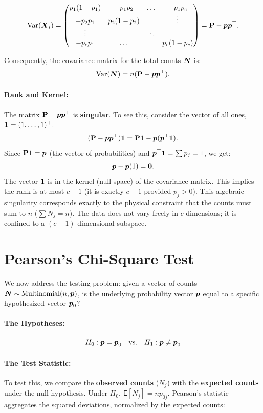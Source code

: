 \[
    \text{Var}(\boldsymbol{X}_i) = \begin{pmatrix}
        p_1(1-p_1) & -p_1p_2 & \dots & -p_1p_c \\
        -p_2p_1 & p_2(1-p_2) & & \vdots \\
        \vdots & & \ddots & \\
        -p_cp_1 & \dots & & p_c(1-p_c)
    \end{pmatrix}
    = \mathbf{P} - \boldsymbol{p}\boldsymbol{p}^\top.
\]

Consequently, the covariance matrix for the total counts $\boldsymbol{N}$ is:
\[
    \text{Var}(\boldsymbol{N}) = n (\mathbf{P} - \boldsymbol{p}\boldsymbol{p}^\top).
\]

\paragraph{Rank and Kernel:}
The matrix $\mathbf{P} - \boldsymbol{p}\boldsymbol{p}^\top$ is \textbf{singular}. To see this, consider the vector of all ones, $\boldsymbol{1} = (1, \dots, 1)^\top$.
\[
    (\mathbf{P} - \boldsymbol{p}\boldsymbol{p}^\top)\boldsymbol{1} = \mathbf{P}\boldsymbol{1} - \boldsymbol{p}(\boldsymbol{p}^\top \boldsymbol{1}).
\]
Since $\mathbf{P}\boldsymbol{1} = \boldsymbol{p}$ (the vector of probabilities) and $\boldsymbol{p}^\top \boldsymbol{1} = \sum p_j = 1$, we get:
\[
    \boldsymbol{p} - \boldsymbol{p}(1) = \boldsymbol{0}.
\]
The vector $\boldsymbol{1}$ is in the kernel (null space) of the covariance matrix. This implies the rank is at most $c-1$ (it is exactly $c-1$ provided $p_j > 0$).
This algebraic singularity corresponds exactly to the physical constraint that the counts must sum to $n$ ($\sum N_j = n$). The data does not vary freely in $c$ dimensions; it is confined to a $(c-1)$-dimensional subspace.

\section{Pearson's Chi-Square Test}
\label{sec:Pearson's Chi-Square Test}

We now address the testing problem: given a vector of counts $\boldsymbol{N} \sim \text{Multinomial}(n, \boldsymbol{p})$, is the underlying probability vector $\boldsymbol{p}$ equal to a specific hypothesized vector $\boldsymbol{p}_0$?

\paragraph{The Hypotheses:}
\[
    H_0: \boldsymbol{p} = \boldsymbol{p}_0 \quad \text{vs.} \quad H_1: \boldsymbol{p} \neq \boldsymbol{p}_0
\]

\paragraph{The Test Statistic:}
To test this, we compare the \textbf{observed counts} ($N_j$) with the \textbf{expected counts} under the null hypothesis. Under $H_0$, $\mathsf{E}[N_j] = n p_{0j}$. Pearson's statistic aggregates the squared deviations, normalized by the expected counts:


